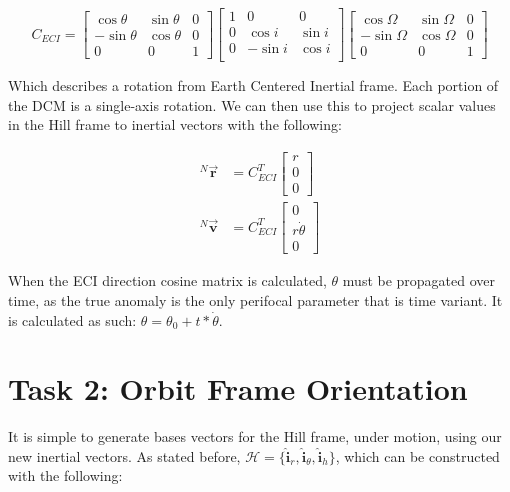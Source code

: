 \documentclass[paper]{aiaaNew}
\begin{document}
\begin{equation}
C_{ECI} = 
\begin{bmatrix}
\cos{\theta} & \sin{\theta} & 0 \\
-\sin{\theta} & \cos{\theta} & 0 \\
0 & 0 & 1 
\end{bmatrix}
\begin{bmatrix}
1 & 0 & 0 \\
0 & \cos{i} & \sin{i} \\
0 & -\sin{i} & \cos{i} \\
\end{bmatrix}
\begin{bmatrix}
\cos{\Omega} & \sin{\Omega} & 0 \\
-\sin{\Omega} & \cos{\Omega} & 0 \\
0 & 0 & 1 
\end{bmatrix}
\end{equation}

Which describes a rotation from Earth Centered Inertial frame. Each portion of the DCM is a single-axis rotation. We can then use this to project scalar values in the Hill frame to inertial vectors with the following:

\begin{align}
  ^N\vec{\bm{r}} &= C_{ECI}^T 
  \begin{bmatrix}
  r \\ 0 \\ 0
  \end{bmatrix} \\
  ^N\vec{\bm{v}} &= C_{ECI}^T
  \begin{bmatrix}
  0 \\ r\dot{\theta} \\ 0
  \end{bmatrix}
\end{align}

When the ECI direction cosine matrix is calculated, $\theta$ must be propagated over time, as the true anomaly is the only perifocal parameter that is time variant. It is calculated as such: $\theta = \theta_0 + t*\dot{\theta}$.







\section*{Task 2: Orbit Frame Orientation}
It is simple to generate bases vectors for the Hill frame, under motion, using our new inertial vectors. As stated before, $\mathcal{H} = \{\bm{\hat{i}}_r, \bm{\hat{i}}_\theta, \bm{\hat{i}}_h \}$, which can be constructed with the following:
\end{document}
